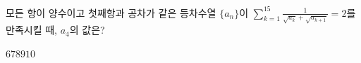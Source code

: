 모든 항이 양수이고 첫째항과 공차가 같은 등차수열 $\{a_n\}$이 $\displaystyle\sum_{k=1}^{15}\frac{1}{\sqrt{a_k}+\sqrt{a_{k+1}}}=2$를 만족시킬 때, $a_4$의 값은?
\begin{choices32}{$6$}{$7$}{$8$}{$9$}{$10$}\end{choices32}
